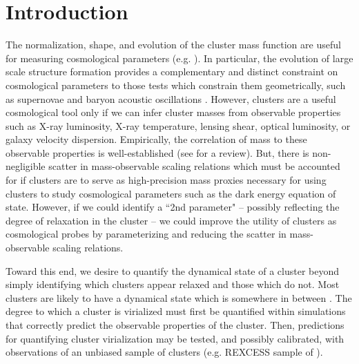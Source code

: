 \documentclass[12pt,preprint]{aastex}
\begin{document}
\section{Introduction}\label{sec:intro}

The normalization, shape, and evolution of the cluster mass function
are useful for measuring cosmological parameters
(e.g. \citealt{1989ApJ...341L..71E, 1998ApJ...508..483W,
2001ApJ...553..545H,  2004PhRvD..70l3008W}). In particular, the
evolution of large scale structure formation provides a complementary
and distinct constraint on cosmological parameters to those tests
which constrain them geometrically, such as supernovae
\citep{1998AJ....116.1009R, 2007ApJ...659...98R} and baryon acoustic
oscillations \citep{2005ApJ...633..560E}. However, clusters are a
useful cosmological tool only if we can infer cluster masses from
observable properties such as X-ray luminosity, X-ray temperature,
lensing shear, optical luminosity, or galaxy velocity
dispersion. Empirically, the correlation of mass to these observable
properties is well-established (see \cite{2005RvMP...77..207V} for a review). But, there
is non-negligible scatter in mass-observable scaling relations which must be
accounted for if clusters are to serve as high-precision mass proxies
necessary for using clusters to study cosmological parameters such as
the dark energy equation of state. However, if we could identify a
``2nd parameter" -- possibly reflecting the degree of relaxation in
the cluster -- we could improve the utility of clusters as
cosmological probes by parameterizing and reducing the scatter in
mass-observable scaling relations.

Toward this end, we desire to quantify the dynamical state of a
cluster beyond simply identifying which clusters appear relaxed and
those which do not. Most clusters are likely to have a dynamical state
which is somewhere in between \citep{2006ApJ...639...64O,
2006ApJ...650..128K, VV08}. The degree to which a cluster is
virialized must first be quantified within simulations that correctly
predict the observable properties of the cluster. Then, predictions
for quantifying cluster virialization may be tested, and possibly
calibrated, with observations of an unbiased sample of clusters
(e.g. REXCESS sample of \citealt{2007A&A...469..363B}).
\end{document}
